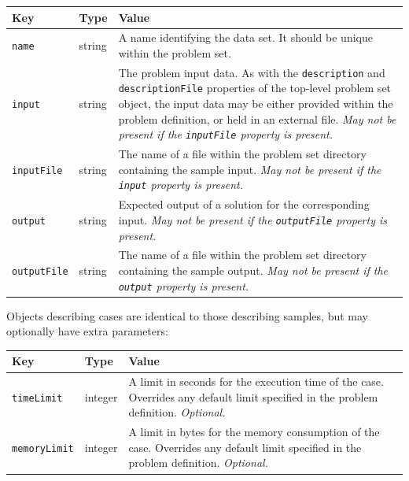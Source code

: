 \documentclass[11pt,letterpaper]{article}
\begin{document}
\nopagebreak
\begin{tabulary}{\textwidth}{ | l | l | L | }
    \hline
    \textbf{Key} & \textbf{Type} & \textbf{Value} \\
    \hline
    \texttt{name} & string & A name identifying the data set. It should be
        unique within the problem set. \\
    \hline
    \texttt{input} & string & The problem input data. As with the
        \texttt{description} and \texttt{descriptionFile} properties of the
        top-level problem set object, the input data may be either provided
        within the problem definition, or held in an external file.
        \newline
        \emph{May not be present if the \texttt{inputFile} property is
        present.} \\
    \hline
    \texttt{inputFile} & string & The name of a file within the problem
        set directory containing the sample input.
        \newline
        \emph{May not be present if the \texttt{input} property is present.} \\
    \hline
    \texttt{output} & string & Expected output of a solution for the
        corresponding input.
        \newline
        \emph{May not be present if the \texttt{outputFile} property is
        present.} \\
    \hline
    \texttt{outputFile} & string & The name of a file within the problem
        set directory containing the sample output.
        \newline
        \emph{May not be present if the \texttt{output} property is present.}
        \\
    \hline
\end{tabulary}

Objects describing cases are identical to those describing samples, but may
optionally have extra parameters:

\nopagebreak
\begin{tabulary}{\textwidth}{ | l | l | L | }
    \hline
    \textbf{Key} & \textbf{Type} & \textbf{Value} \\
    \hline
    \texttt{timeLimit} & integer & A limit in seconds for the execution time of
        the case. Overrides any default limit specified in the problem
        definition. \emph{Optional.} \\
    \hline
    \texttt{memoryLimit} & integer & A limit in bytes for the memory
        consumption of the case. Overrides any default limit specified in the
        problem definition. \emph{Optional.} \\
    \hline
\end{tabulary}
\end{document}
